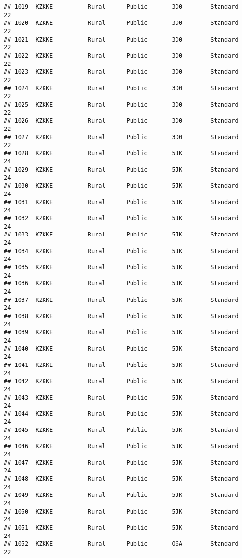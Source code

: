 \documentclass[
]{article}
\begin{document}
\begin{verbatim}
## 1019  KZKKE          Rural      Public       3D0        Standard        22
## 1020  KZKKE          Rural      Public       3D0        Standard        22
## 1021  KZKKE          Rural      Public       3D0        Standard        22
## 1022  KZKKE          Rural      Public       3D0        Standard        22
## 1023  KZKKE          Rural      Public       3D0        Standard        22
## 1024  KZKKE          Rural      Public       3D0        Standard        22
## 1025  KZKKE          Rural      Public       3D0        Standard        22
## 1026  KZKKE          Rural      Public       3D0        Standard        22
## 1027  KZKKE          Rural      Public       3D0        Standard        22
## 1028  KZKKE          Rural      Public       5JK        Standard        24
## 1029  KZKKE          Rural      Public       5JK        Standard        24
## 1030  KZKKE          Rural      Public       5JK        Standard        24
## 1031  KZKKE          Rural      Public       5JK        Standard        24
## 1032  KZKKE          Rural      Public       5JK        Standard        24
## 1033  KZKKE          Rural      Public       5JK        Standard        24
## 1034  KZKKE          Rural      Public       5JK        Standard        24
## 1035  KZKKE          Rural      Public       5JK        Standard        24
## 1036  KZKKE          Rural      Public       5JK        Standard        24
## 1037  KZKKE          Rural      Public       5JK        Standard        24
## 1038  KZKKE          Rural      Public       5JK        Standard        24
## 1039  KZKKE          Rural      Public       5JK        Standard        24
## 1040  KZKKE          Rural      Public       5JK        Standard        24
## 1041  KZKKE          Rural      Public       5JK        Standard        24
## 1042  KZKKE          Rural      Public       5JK        Standard        24
## 1043  KZKKE          Rural      Public       5JK        Standard        24
## 1044  KZKKE          Rural      Public       5JK        Standard        24
## 1045  KZKKE          Rural      Public       5JK        Standard        24
## 1046  KZKKE          Rural      Public       5JK        Standard        24
## 1047  KZKKE          Rural      Public       5JK        Standard        24
## 1048  KZKKE          Rural      Public       5JK        Standard        24
## 1049  KZKKE          Rural      Public       5JK        Standard        24
## 1050  KZKKE          Rural      Public       5JK        Standard        24
## 1051  KZKKE          Rural      Public       5JK        Standard        24
## 1052  KZKKE          Rural      Public       O6A        Standard        22

\end{verbatim}
\end{document}
